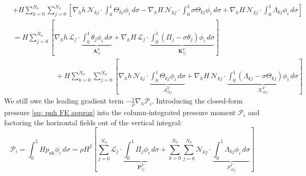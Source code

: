 \documentclass{article}
\newcommand{\Ns}{N_\sigma}
\newcommand{\sumj}{\sum_{j=0}^{\Ns}}
\newcommand{\sumk}{\sum_{k=0}^{\Ns}}
\newcommand{\nablah}{\nabla_h}
\newcommand{\pnh}{p_{\text{nh}}}
\newcommand{\VAij}{\mathbf{A}_{ij}^V}
\newcommand{\VKij}{\mathbf{K}_{ij}^V}
\newcommand{\VAikj}{\boldsymbol{\mathcal{A}}_{ikj}^V}
\newcommand{\VKikj}{\boldsymbol{\mathcal{K}}_{ikj}^V}
\newcommand{\VPij}{\mathbf{P}_{ij}^V}
\newcommand{\VPikj}{\boldsymbol{\mathcal{P}}_{ikj}^V}
\newcommand{\Pcol}{\mathcal{P}_i}
\begin{document}
\begin{itemize}
\begin{align*}
        & + H \sumk \sumj\left[ \nablah h\, \mathcal{N}_{kj} \cdot \int_0^1 \Theta_{kj} \phi_i\, d\sigma 
        - \nablah H\, \mathcal{N}_{kj} \cdot\int_0^1  \sigma \Theta_{kj} \phi_i\, d\sigma 
        +\nablah H\, \mathcal{N}_{kj} \cdot \int_0^1  \Lambda_{kj}\phi_i\, d\sigma  \right] \\
        &= H \sumj \left[ \nablah h\, \mathcal{L}_j \cdot \underbrace{\int_0^1 \theta_j\phi_i \, d\sigma}_{\VAij} 
        + \nablah H\, \mathcal{L}_j \cdot \underbrace{\int_0^1 \left(\Pi_j-\sigma \theta_j\right) \phi_i \, d\sigma}_{\VKij} \right] \\
        & \qquad\qquad\qquad+ H \sumk \sumj\left[ \nablah h\, \mathcal{N}_{kj} \cdot \underbrace{\int_0^1 \Theta_{kj} \phi_i\, d\sigma}_{\VAikj} 
        + \nablah H\, \mathcal{N}_{kj} \cdot \underbrace{\int_0^1  \left( \Lambda_{kj}-\sigma \Theta_{kj}\right) \phi_i\, d\sigma}_{\VKikj} \right] 
    \end{align*}
    We still owe the leading gradient term $-\frac{1}{\rho}\nablah\Pcol$. Introducing the closed-form pressure \eqref{eq: pnh FE approx} into the column-integrated pressure moment $\Pcol$ and factoring the horizontal fields out of the vertical integral:
    $$\Pcol = \int_0^1 H \pnh \phi_i \, d\sigma = \rho H^2 \left[ \sumj \mathcal{L}_j \cdot \underbrace{\int_0^1 \Pi_j \phi_i \, d\sigma}_{\VPij} + \sumk\sumj \mathcal{N}_{kj} \cdot \underbrace{\int_0^1 \Lambda_{kj} \phi_i \, d\sigma}_{\VPikj} \right]$$
    

\end{itemize}
\end{document}
